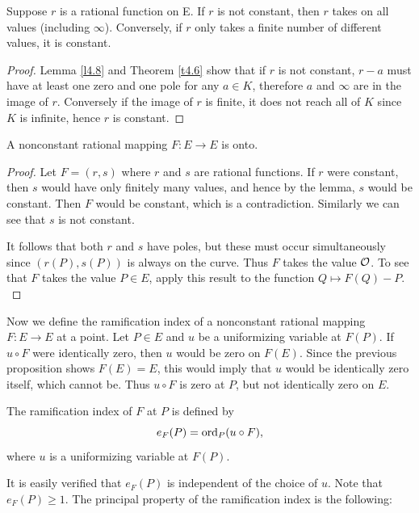 \begin{lem}
\label{l11.1}
Suppose $r$ is a rational function on E. If $r$ is not constant, then $r$ takes on all values (including $\infty$). Conversely, if $r$ only takes a finite number of different values, it is constant.
\end{lem}

\begin{proof}
Lemma \ref{l4.8} and Theorem \ref{t4.6} show that if $r$ is not constant, $r-a$ must have at least one zero and one pole for any $a\in K$, therefore $a$ and $\infty$ are in the image of $r$. Conversely if the image of $r$ is finite, it does not reach all of $K$ since $K$ is infinite, hence $r$ is constant.
\end{proof}

\begin{prop}
\label{e11.2}
A nonconstant rational mapping $F:E\rightarrow E$ is onto.
\end{prop}

\begin{proof} Let $F=(r, s)$ where $r$ and $s$ are rational functions. If $r$ were constant, then $s$ would have only finitely many values, and hence by the lemma, $s$ would be constant. Then $F$ would be constant, which is a contradiction. Similarly we can see that $s$ is not constant.

It follows that both $r$ and $s$ have poles, but these must occur simultaneously since $(r(P), s(P))$ is always on the curve. Thus $F$ takes the value $\mathcal{O}$. To see that $F$ takes the value $P\in E$, apply this result to the function $Q\mapsto F(Q)-P.$
\end{proof}

Now we define the ramification index of a nonconstant rational mapping $F:E\rightarrow E$ at a point. Let $P\in E$ and $u$ be a uniformizing variable at $F(P)$. If $u\circ F$ were identically zero, then $u$ would be zero on $F(E)$. Since the previous proposition shows $F(E)=E$, this would imply that $u$ would be identically zero itself, which cannot be. Thus $u\circ F$ is zero at $P$, but not identically zero on $E$.

\begin{defi}
\label{l11.3}
The ramification index of $F$ at $P$ is defined by
$$
e_{F}(P)=\operatorname{ord}_{P}(u\circ F),
$$
where $u$ is a uniformizing variable at $F(P)$.
\end{defi}

It is easily verified that $e_{F}(P)$ is independent of the choice of $u$. Note that $e_{F}(P)\geq 1$. The principal property of the ramification index is the following:

